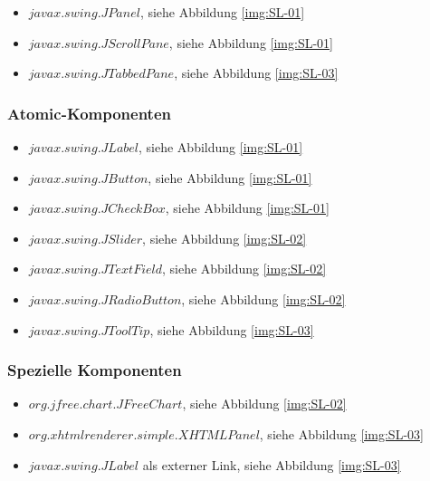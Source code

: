   \begin{itemize}
    \item \(javax.swing.JPanel\), siehe Abbildung \ref{img:SL-01}
    \item \(javax.swing.JScrollPane\), siehe Abbildung \ref{img:SL-01}
    \item \(javax.swing.JTabbedPane\), siehe Abbildung \ref{img:SL-03}
  \end{itemize}
  
  \subsubsection{Atomic-Komponenten}
  
  \begin{itemize}
    \item \(javax.swing.JLabel\), siehe Abbildung \ref{img:SL-01}
    \item \(javax.swing.JButton\), siehe Abbildung \ref{img:SL-01}
    \item \(javax.swing.JCheckBox\), siehe Abbildung \ref{img:SL-01}
    \item \(javax.swing.JSlider\), siehe Abbildung \ref{img:SL-02}
    \item \(javax.swing.JTextField\), siehe Abbildung \ref{img:SL-02}
    \item \(javax.swing.JRadioButton\), siehe Abbildung \ref{img:SL-02}
    \item \(javax.swing.JToolTip\), siehe Abbildung \ref{img:SL-03}
  \end{itemize}
  
  \subsubsection{Spezielle Komponenten}
  
  \begin{itemize}
    \item \(org.jfree.chart.JFreeChart\), siehe Abbildung \ref{img:SL-02}
    \item \(org.xhtmlrenderer.simple.XHTMLPanel\), siehe Abbildung
    \ref{img:SL-03}
    \item \(javax.swing.JLabel\) als externer Link, siehe Abbildung
    \ref{img:SL-03}
  \end{itemize}
  
